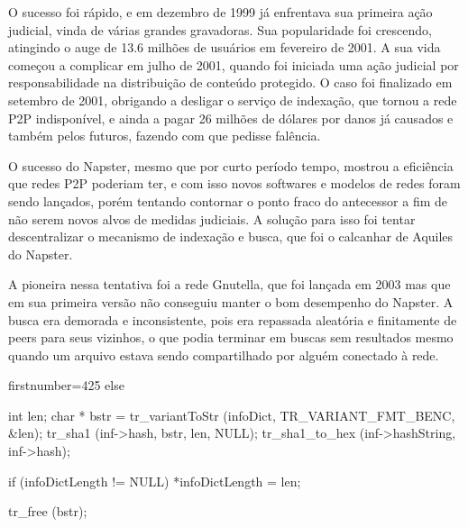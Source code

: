 O sucesso foi rápido, e em dezembro de 1999 já enfrentava sua primeira ação judicial, vinda de várias grandes gravadoras. Sua popularidade foi crescendo, atingindo o auge de 13.6 milhões de usuários em fevereiro de 2001. A sua vida começou a complicar em julho de 2001, quando foi iniciada uma ação judicial por responsabilidade na distribuição de conteúdo protegido. O caso foi finalizado em setembro de 2001, obrigando a desligar o serviço de indexação, que tornou a rede P2P indisponível, e ainda a pagar 26 milhões de dólares por danos já causados e também pelos futuros, fazendo com que pedisse falência.

O sucesso do Napster, mesmo que por curto período tempo, mostrou a eficiência que redes P2P poderiam ter, e com isso novos softwares e modelos de redes foram sendo lançados, porém tentando contornar o ponto fraco do antecessor a fim de não serem novos alvos de medidas judiciais. A solução para isso foi tentar descentralizar o mecanismo de indexação e busca, que foi o calcanhar de Aquiles do Napster.

A pioneira nessa tentativa foi a rede Gnutella, que foi lançada em 2003 mas que em sua primeira versão não conseguiu manter o bom desempenho do Napster. A busca era demorada e inconsistente, pois era repassada aleatória e finitamente de peers para seus vizinhos, o que podia terminar em buscas sem resultados mesmo quando um arquivo estava sendo compartilhado por alguém conectado à rede. 

\begin{listing}[H]
	\begin{cppcode*} {firstnumber=425}
	  else
	  {
	    int len;
	    char * bstr = tr_variantToStr (infoDict, TR_VARIANT_FMT_BENC,   &len);
	    tr_sha1 (inf->hash, bstr, len, NULL);
	    tr_sha1_to_hex (inf->hashString, inf->hash);
	  
	    if (infoDictLength != NULL)
	      *infoDictLength = len;
	  
	    tr_free (bstr);
	  }
	\end{cppcode*}
\end{listing}